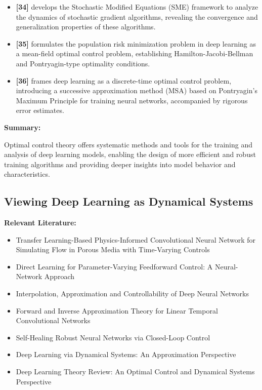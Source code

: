 \documentclass{article}
\theoremstyle{plain}
\theoremstyle{definition}
\theoremstyle{remark}
\begin{document}
\begin{itemize}
    \item \textbf{[34]} develops the Stochastic Modified Equations (SME) framework to analyze the dynamics of stochastic gradient algorithms, revealing the convergence and generalization properties of these algorithms.
    
    \item \textbf{[35]} formulates the population risk minimization problem in deep learning as a mean-field optimal control problem, establishing Hamilton-Jacobi-Bellman and Pontryagin-type optimality conditions.
    
    \item \textbf{[36]} frames deep learning as a discrete-time optimal control problem, introducing a successive approximation method (MSA) based on Pontryagin's Maximum Principle for training neural networks, accompanied by rigorous error estimates.
\end{itemize}

\textbf{Summary:}

Optimal control theory offers systematic methods and tools for the training and analysis of deep learning models, enabling the design of more efficient and robust training algorithms and providing deeper insights into model behavior and characteristics.

\subsection{Viewing Deep Learning as Dynamical Systems}
\textbf{Relevant Literature:}
\begin{itemize}
    \item Transfer Learning-Based Physics-Informed Convolutional Neural Network for Simulating Flow in Porous Media with Time-Varying Controls
    \item Direct Learning for Parameter-Varying Feedforward Control: A Neural-Network Approach
    \item Interpolation, Approximation and Controllability of Deep Neural Networks
    \item Forward and Inverse Approximation Theory for Linear Temporal Convolutional Networks
    \item Self-Healing Robust Neural Networks via Closed-Loop Control
    \item Deep Learning via Dynamical Systems: An Approximation Perspective
    \item Deep Learning Theory Review: An Optimal Control and Dynamical Systems Perspective
\end{itemize}
\end{document}
